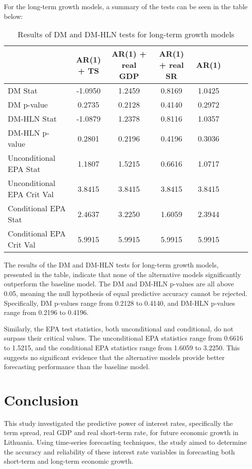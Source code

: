 \documentclass[12pt]{article}
\begin{document}
For the long-term growth models, a summary of the tests can be seen in the table below: 

\begin{table}[H]
\centering
\begin{tabular}{lccccccc}
\hline
 & AR(1) + TS & AR(1) + real GDP & AR(1) + real SR & AR(1) \\
\hline
DM Stat & -1.0950 & 1.2459 & 0.8169 & 1.0425 \\
DM p-value & 0.2735 & 0.2128 & 0.4140 & 0.2972 \\
DM-HLN Stat & -1.0879 & 1.2378 & 0.8116 & 1.0357 \\
DM-HLN p-value & 0.2801 & 0.2196 & 0.4196 & 0.3036 \\
Unconditional EPA Stat & 1.1807 & 1.5215 & 0.6616 & 1.0717 \\
Unconditional EPA Crit Val & 3.8415 & 3.8415 & 3.8415 & 3.8415 \\
Conditional EPA Stat & 2.4637 & 3.2250 & 1.6059 & 2.3944 \\
Conditional EPA Crit Val & 5.9915 & 5.9915 & 5.9915 & 5.9915 \\
\hline
\end{tabular}
\caption{Results of DM and DM-HLN tests for long-term growth models}
\label{tab:dm_test_long_term_transposed}
\end{table}


The results of the DM and DM-HLN tests for long-term growth models, presented in the table, indicate that none of the alternative models significantly outperform the baseline model. The DM and DM-HLN p-values are all above 0.05, meaning the null hypothesis of equal predictive accuracy cannot be rejected. Specifically, DM p-values range from 0.2128 to 0.4140, and DM-HLN p-values range from 0.2196 to 0.4196.

Similarly, the EPA test statistics, both unconditional and conditional, do not surpass their critical values. The unconditional EPA statistics range from 0.6616 to 1.5215, and the conditional EPA statistics range from 1.6059 to 3.2250. This suggests no significant evidence that the alternative models provide better forecasting performance than the baseline model.

\newpage

\section{Conclusion}

This study investigated the predictive power of interest rates, specifically the term spread, real GDP and real short-term rate, for future economic growth in Lithuania. Using time-series forecasting techniques, the study aimed to determine the accuracy and reliability of these interest rate variables in forecasting both short-term and long-term economic growth.
\end{document}
